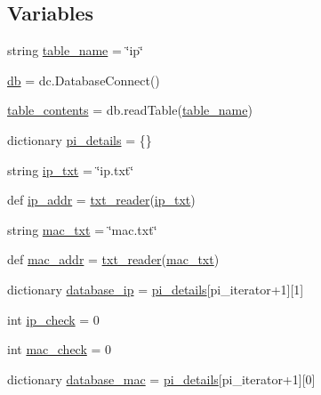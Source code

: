 \subsection*{Variables}
\begin{DoxyCompactItemize}
\item 
string \mbox{\hyperlink{namespacedevice__emitter_ae71d803969e8f98677e12dc98159d6de}{table\+\_\+name}} = \char`\"{}ip\char`\"{}
\item 
\mbox{\hyperlink{namespacedevice__emitter_a0559bc31b21eed1581ff97fccbbd75d7}{db}} = dc.\+Database\+Connect()
\item 
\mbox{\hyperlink{namespacedevice__emitter_a41adb72e6db041039a6416f891820c45}{table\+\_\+contents}} = db.\+read\+Table(\mbox{\hyperlink{namespacedevice__emitter_ae71d803969e8f98677e12dc98159d6de}{table\+\_\+name}})
\item 
dictionary \mbox{\hyperlink{namespacedevice__emitter_a803e1fc15d8f8f4445053a2b36e7ac0b}{pi\+\_\+details}} = \{\}
\item 
string \mbox{\hyperlink{namespacedevice__emitter_adffb57ad574487e214cf5a3033abbae8}{ip\+\_\+txt}} = \char`\"{}ip.\+txt\char`\"{}
\item 
def \mbox{\hyperlink{namespacedevice__emitter_accb17d54f29bb0b5cc59b7f81d3ed0f3}{ip\+\_\+addr}} = \mbox{\hyperlink{namespacedevice__emitter_a37babfaa6ea3bbb358c94516521f9442}{txt\+\_\+reader}}(\mbox{\hyperlink{namespacedevice__emitter_adffb57ad574487e214cf5a3033abbae8}{ip\+\_\+txt}})
\item 
string \mbox{\hyperlink{namespacedevice__emitter_ad664a79343b74123be899bb0752a6fb1}{mac\+\_\+txt}} = \char`\"{}mac.\+txt\char`\"{}
\item 
def \mbox{\hyperlink{namespacedevice__emitter_ac0f4af4fd7abf558f1b2ad320894f040}{mac\+\_\+addr}} = \mbox{\hyperlink{namespacedevice__emitter_a37babfaa6ea3bbb358c94516521f9442}{txt\+\_\+reader}}(\mbox{\hyperlink{namespacedevice__emitter_ad664a79343b74123be899bb0752a6fb1}{mac\+\_\+txt}})
\item 
dictionary \mbox{\hyperlink{namespacedevice__emitter_ae3817f26c179f6e6e62775fcabaa1bc9}{database\+\_\+ip}} = \mbox{\hyperlink{namespacedevice__emitter_a803e1fc15d8f8f4445053a2b36e7ac0b}{pi\+\_\+details}}\mbox{[}pi\+\_\+iterator+1\mbox{]}\mbox{[}1\mbox{]}
\item 
int \mbox{\hyperlink{namespacedevice__emitter_a1797fb3f5a71e4f2212c4a43454141a2}{ip\+\_\+check}} = 0
\item 
int \mbox{\hyperlink{namespacedevice__emitter_ae5bc45db5e138407237ffd7c0d38afba}{mac\+\_\+check}} = 0
\item 
dictionary \mbox{\hyperlink{namespacedevice__emitter_a74cf5779300d3c95c075f304d1340771}{database\+\_\+mac}} = \mbox{\hyperlink{namespacedevice__emitter_a803e1fc15d8f8f4445053a2b36e7ac0b}{pi\+\_\+details}}\mbox{[}pi\+\_\+iterator+1\mbox{]}\mbox{[}0\mbox{]}
\end{DoxyCompactItemize}


